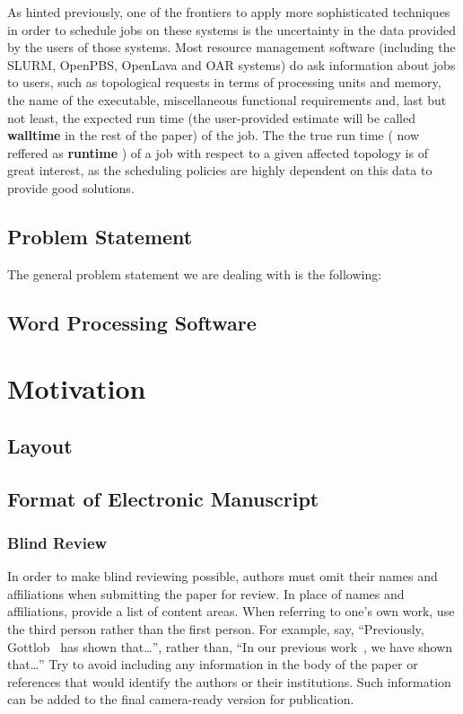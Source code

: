 \documentclass{article}
\begin{document}
As hinted previously, one of the frontiers to apply more sophisticated techniques in order to schedule jobs on these systems is the uncertainty in the data provided by the users of those systems.
Most resource management software (including the SLURM, OpenPBS, OpenLava and OAR systems) do ask information about jobs to users, such as topological requests in terms of processing units and memory, the name of the executable, miscellaneous functional requirements and, last but not least, the expected run time (the user-provided estimate will be called \textbf{walltime} in the rest of the paper) of the job.
The the true run time ( now reffered as \textbf{runtime} ) of a job with respect to a given affected topology  is of great interest, as the scheduling policies are highly dependent on this data to provide good solutions.


\subsection{Problem Statement}
The general problem statement we are dealing with is the following:


\subsection{Word Processing Software}

\section{Motivation}

\subsection{Layout}


\subsection{Format of Electronic Manuscript}


\subsubsection{Blind Review}

In order to make blind reviewing possible, authors must omit their
names and affiliations when submitting the paper for review. In place
of names and affiliations, provide a list of content areas. When
referring to one's own work, use the third person rather than the
first person. For example, say, ``Previously,
Gottlob~ has shown that\ldots'', rather
than, ``In our previous work~\cite{gottlob:nonmon}, we have shown
that\ldots'' Try to avoid including any information in the body of the
paper or references that would identify the authors or their
institutions. Such information can be added to the final camera-ready
version for publication.
\end{document}
